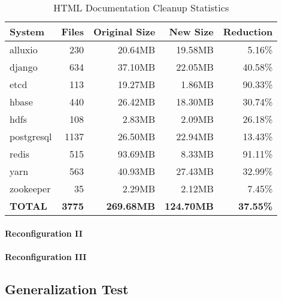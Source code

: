 \begin{table}[h]
    \centering
    \begin{tabular}{|l|r|r|r|r|}
        \hline
        \textbf{System} & \textbf{Files} & \textbf{Original Size} & \textbf{New Size} & \textbf{Reduction} \\
        \hline
        alluxio & 230 & 20.64MB & 19.58MB & 5.16\% \\
        django & 634 & 37.10MB & 22.05MB & 40.58\% \\
        etcd & 113 & 19.27MB & 1.86MB & 90.33\% \\
        hbase & 440 & 26.42MB & 18.30MB & 30.74\% \\
        hdfs & 108 & 2.83MB & 2.09MB & 26.18\% \\
        postgresql & 1137 & 26.50MB & 22.94MB & 13.43\% \\
        redis & 515 & 93.69MB & 8.33MB & 91.11\% \\
        yarn & 563 & 40.93MB & 27.43MB & 32.99\% \\
        zookeeper & 35 & 2.29MB & 2.12MB & 7.45\% \\
        \hline
        \textbf{TOTAL} & \textbf{3775} & \textbf{269.68MB} & \textbf{124.70MB} & \textbf{37.55\%} \\
        \hline
    \end{tabular}
    \caption{HTML Documentation Cleanup Statistics}
    \label{tab:cleanup_stats}
\end{table}
\paragraph{Reconfiguration II} \label{sec:exp_reconfig_2}


\paragraph{Reconfiguration III} \label{sec:exp_reconfig_3}

\subsection{Generalization Test} \label{sec:exp_generalization}

